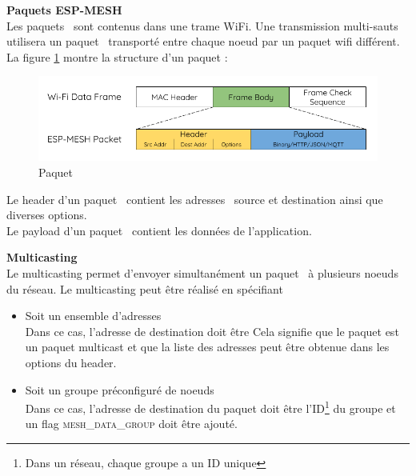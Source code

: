         \textbf{Paquets ESP-MESH}\\
            Les paquets \espmesh\ sont contenus dans une trame WiFi. Une transmission multi-sauts utilisera un paquet \espmesh\ transporté 
            entre chaque noeud par un paquet wifi différent.\\
            La figure \ref{fig_meshPacket} montre la structure d'un paquet \espmesh:\\

            \begin{figure}[h]
                \centering
                \includegraphics[scale=0.5]{images/mesh-packet.png}
                \caption{Paquet \espmesh\ \cite{esp-mesh_w}}
                \label{fig_meshPacket}
            \end{figure}
            Le header d'un paquet \espmesh\ contient les adresses \mac\ source et destination ainsi que diverses options.\\
            Le payload d'un paquet \espmesh\ contient les données de l'application.
        
        \vspace{0.5cm}
        \textbf{Multicasting}\\
            Le multicasting permet d'envoyer simultanément un paquet \espmesh\ à plusieurs noeuds du réseau. Le multicasting
            peut être réalisé en spécifiant
            \begin{itemize}
                \item Soit un ensemble d'adresses \mac\\
                    Dans ce cas, l'adresse de destination doit être
                    {\selectfont {}}
                    Cela signifie que le paquet est un paquet multicast et que la liste des adresses peut être obtenue dans les options du header.
                \item Soit un groupe préconfiguré de noeuds\\
                    Dans ce cas, l'adresse de destination du paquet doit être l'ID\footnote{Dans un réseau\espmesh, chaque groupe a un ID unique}
                    du groupe et un flag \textsc{mesh\_data\_group} doit être ajouté. %
            \end{itemize}

